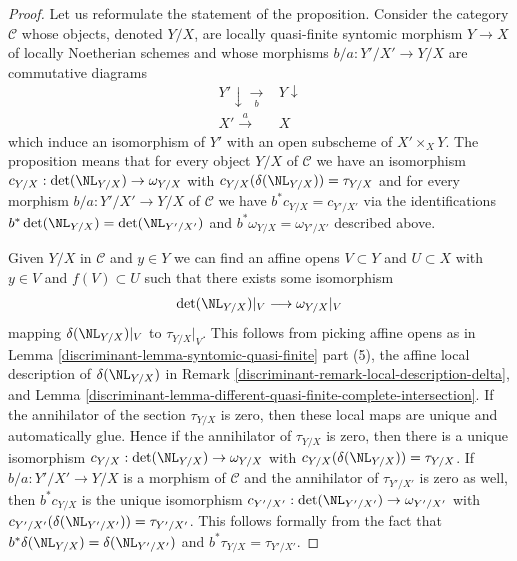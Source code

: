 \begin{proof}

Let us reformulate the statement of the proposition. Consider the category
$\mathcal{C}$ whose objects, denoted $Y/X$, are locally quasi-finite syntomic
morphism $Y \to X$ of locally Noetherian schemes and whose morphisms
$b/a : Y'/X' \to Y/X$ are commutative diagrams
$$
\begin{array}{cc}Y' \downarrow\underset{b}{\longrightarrow} & Y \downarrow \\ X' \overset{a}{\longrightarrow} & X\end{array}
$$
which induce an isomorphism of $Y'$ with an open subscheme of
$X' \times_X Y$. The proposition means that for every object
$Y/X$ of $\mathcal{C}$ we have an isomorphism
$c_{Y/X} : \det(\NL_{Y/X}) \to \omega_{Y/X}$
with $c_{Y/X}(\delta(\NL_{Y/X})) = \tau_{Y/X}$
and for every morphism $b/a : Y'/X' \to Y/X$ of $\mathcal{C}$ we have
$b^*c_{Y/X} = c_{Y'/X'}$ via the identifications
$b^*\det(\NL_{Y/X}) = \det(\NL_{Y'/X'})$ and
$b^*\omega_{Y/X} = \omega_{Y'/X'}$ described above.

\medskip\noindent
Given $Y/X$ in $\mathcal{C}$ and $y \in Y$ we can find
an affine opens $V \subset Y$ and $U \subset X$ with
$y \in V$ and $f(V) \subset U$
such that there exists some isomorphism
$$
\det(\NL_{Y/X})|_V \longrightarrow \omega_{Y/X}|_V
$$
mapping $\delta(\NL_{Y/X})|_V$ to $\tau_{Y/X}|_V$. This follows
from picking affine opens as in
Lemma \ref{discriminant-lemma-syntomic-quasi-finite} part (5), the affine
local description of $\delta(\NL_{Y/X})$ in
Remark \ref{discriminant-remark-local-description-delta}, and
Lemma \ref{discriminant-lemma-different-quasi-finite-complete-intersection}.
If the annihilator of the section $\tau_{Y/X}$ is zero, then
these local maps are unique and automatically glue. Hence if the annihilator
of $\tau_{Y/X}$ is zero, then there is a unique isomorphism
$c_{Y/X} : \det(\NL_{Y/X}) \to \omega_{Y/X}$ with
$c_{Y/X}(\delta(\NL_{Y/X})) = \tau_{Y/X}$.
If $b/a : Y'/X' \to Y/X$ is a morphism of $\mathcal{C}$
and the annihilator of $\tau_{Y'/X'}$ is zero as well,
then $b^*c_{Y/X}$ is the unique isomorphism
$c_{Y'/X'} : \det(\NL_{Y'/X'}) \to \omega_{Y'/X'}$ with
$c_{Y'/X'}(\delta(\NL_{Y'/X'})) = \tau_{Y'/X'}$.
This follows formally from the fact that
$b^*\delta(\NL_{Y/X}) = \delta(\NL_{Y'/X'})$ and
$b^*\tau_{Y/X} = \tau_{Y'/X'}$.


\end{proof}
